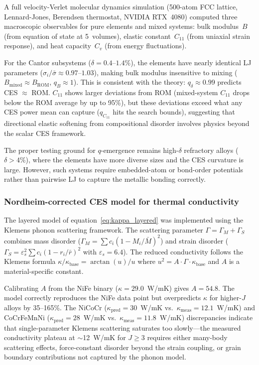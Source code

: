 \documentclass[12pt,letterpaper]{article}
\theoremstyle{definition}
\begin{document}
A full velocity-Verlet molecular dynamics simulation (500-atom FCC lattice, Lennard-Jones, Berendsen thermostat, NVIDIA RTX~4080) computed three macroscopic observables for pure elements and mixed systems: bulk modulus~$B$ (from equation of state at 5~volumes), elastic constant~$C_{11}$ (from uniaxial strain response), and heat capacity~$C_v$ (from energy fluctuations).

For the Cantor subsystems ($\delta = 0.4$--$1.4\%$), the elements have nearly identical LJ parameters ($\sigma_i/\bar{\sigma} \approx 0.97$--$1.03$), making bulk modulus insensitive to mixing ($B_{\mathrm{mixed}} \approx B_{\mathrm{ROM}}$, $q_B \approx 1$).  This is consistent with the theory: $q_\delta \approx 0.99$ predicts CES $\approx$ ROM\@.  $C_{11}$ shows larger deviations from ROM (mixed-system $C_{11}$ drops below the ROM average by up to 95\%), but these deviations exceed what any CES power mean can capture ($q_{C_{11}}$ hits the search bounds), suggesting that directional elastic softening from compositional disorder involves physics beyond the scalar CES framework.

The proper testing ground for $q$-emergence remains high-$\delta$ refractory alloys ($\delta > 4\%$), where the elements have more diverse sizes and the CES curvature is large.  However, such systems require embedded-atom or bond-order potentials rather than pairwise LJ to capture the metallic bonding correctly.

\subsubsection{Nordheim-corrected CES model for thermal conductivity}

The layered model of equation~\ref{eq:kappa_layered} was implemented using the Klemens phonon scattering framework.  The scattering parameter $\Gamma = \Gamma_M + \Gamma_S$ combines mass disorder ($\Gamma_M = \sum c_i(1 - M_i/\bar{M})^2$) and strain disorder ($\Gamma_S = \varepsilon_s^2 \sum c_i(1 - r_i/\bar{r})^2$ with $\varepsilon_s = 6.4$).  The reduced conductivity follows the Klemens formula $\kappa/\kappa_{\mathrm{base}} = \arctan(u)/u$ where $u^2 = A \cdot \Gamma \cdot \kappa_{\mathrm{base}}$ and $A$ is a material-specific constant.

Calibrating $A$ from the NiFe binary ($\kappa = 29.0$~W/mK) gives $A = 54.8$.  The model correctly reproduces the NiFe data point but overpredicts $\kappa$ for higher-$J$ alloys by 35--165\%.  The NiCoCr ($\kappa_{\mathrm{pred}} = 30$~W/mK vs.\ $\kappa_{\mathrm{meas}} = 12.1$~W/mK) and CoCrFeMnNi ($\kappa_{\mathrm{pred}} = 28$~W/mK vs.\ $\kappa_{\mathrm{meas}} = 11.8$~W/mK) discrepancies indicate that single-parameter Klemens scattering saturates too slowly---the measured conductivity plateau at $\sim$12~W/mK for $J \geq 3$ requires either many-body scattering effects, force-constant disorder beyond the strain coupling, or grain boundary contributions not captured by the phonon model.
\end{document}
